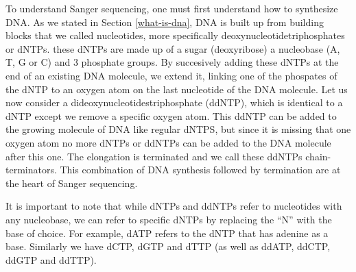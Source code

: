 \documentclass[
  11pt,
  twoside]{scrbook}
\begin{document}
To understand Sanger sequencing, one must first understand how to synthesize DNA. As we stated in Section \ref{what-is-dna}, DNA is built up from building blocks that we called nucleotides, more specifically deoxynucleotidetriphosphates or dNTPs. these dNTPs are made up of a sugar (deoxyribose) a nucleobase (A, T, G or C) and 3 phosphate groups. By succesively adding these dNTPs at the end of an existing DNA molecule, we extend it, linking one of the phospates of the dNTP to an oxygen atom on the last nucleotide of the DNA molecule. Let us now consider a dideoxynucleotidestriphosphate (ddNTP), which is identical to a dNTP except we remove a specific oxygen atom. This ddNTP can be added to the growing molecule of DNA like regular dNTPS, but since it is missing that one oxygen atom no more dNTPs or ddNTPs can be added to the DNA molecule after this one. The elongation is terminated and we call these ddNTPs chain-terminators. This combination of DNA synthesis followed by termination are at the heart of Sanger sequencing.

It is important to note that while dNTPs and ddNTPs refer to nucleotides with any nucleobase, we can refer to specific dNTPs by replacing the ``N'' with the base of choice. For example, dATP refers to the dNTP that has adenine as a base. Similarly we have dCTP, dGTP and dTTP (as well as ddATP, ddCTP, ddGTP and ddTTP).
\end{document}
